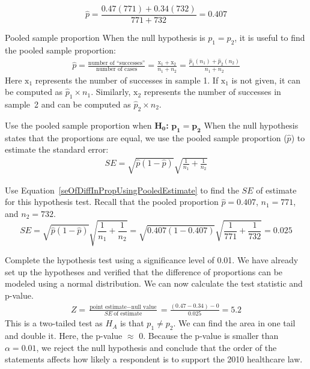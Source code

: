 $$\hat{p} =  \frac{0.47(771) + 0.34(732)}{771+732}= 0.407$$


\begin{onebox}{Pooled sample proportion}
When the null hypothesis is $p_1 = p_2$, it is useful to find the pooled sample proportion:
\begin{eqnarray*}
\hat{p} = \frac{\text{number of ``successes''}}{\text{number of cases}} = \frac{\text{x}_1+\text{x}_2}{n_1+n_2}=\frac{\hat{p}_1(n_1) + \hat{p}_2(n_2)}{n_1 + n_2}
\end{eqnarray*}
Here $\text{x}_1$ represents the number of successes in sample 1. If $\text{x}_1$ is not given, it can be computed as $\hat{p}_1\times n_1$. Similarly, $\text{x}_2$ represents the number of successes in sample~2 and can be computed as $\hat{p}_2\times n_2$.
\end{onebox}

\begin{onebox}{Use the pooled sample proportion when $\mathbf{H_0}$\textbf{:} $\mathbf{p_1 = p_2}$}
When the null hypothesis states that the proportions are equal, we use the pooled sample proportion ($\hat{p}$) to estimate the standard error:
\begin{eqnarray}
SE =\sqrt{\hat{p}(1-\hat{p})}\sqrt{\frac{1}{n_1} + \frac{1}{n_2}}
\label{seOfDiffInPropUsingPooledEstimate}
\end{eqnarray}
\end{onebox}



\begin{examplewrap}
\begin{nexample}{Use Equation~\eqref{seOfDiffInPropUsingPooledEstimate} to find the $SE$ of estimate for this hypothesis test.  Recall that the pooled proportion $\hat{p}=0.407$, $n_1 = 771$, and $n_2=732$.}
$$SE =\sqrt{\hat{p}(1-\hat{p})}\sqrt{\frac{1}{n_1} + \frac{1}{n_2}}=\sqrt{0.407(1-0.407)}\sqrt{\frac{1}{771} + \frac{1}{732}}=0.025$$
\end{nexample}
\end{examplewrap}

\begin{examplewrap}
\begin{nexample}{Complete the hypothesis test using a significance level of 0.01.}
We have already set up the hypotheses and verified that the difference of proportions can be modeled using a normal distribution.  We can now calculate the test statistic and p-value.  
\begin{eqnarray*}
Z = \frac{\text{point estimate} - \text{null value}}{SE\ \text{of estimate}}= \frac{(0.47-0.34) - 0}{0.025} = 5.2
\end{eqnarray*}
This is a two-tailed test as $H_A$ is that $p_1\ne p_2$.  We can find the area in one tail and double it.  Here, the p-value $\approx$ 0.  Because the p-value is smaller than $\alpha = 0.01$, we reject the null hypothesis and conclude that the order of the statements affects how likely a respondent is to support the 2010 healthcare law.
\end{nexample}
\end{examplewrap}
 
